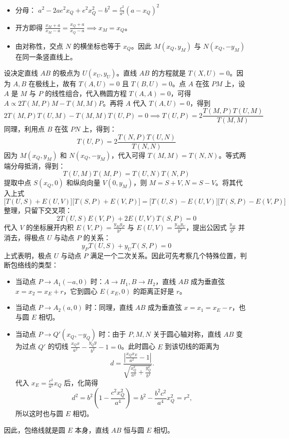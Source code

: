 \begin{solution}
\begin{itemize}
\item 分母： $a^2 - 2a e^2 x_Q + e^2 x_Q^2 - b^2 = \frac{c^2}{a^2}(a-x_Q)^2$
\item 开方即得 $\frac{x_M+a}{x_M-a} = \frac{x_Q+a}{x_Q-a}\implies x_M = x_Q$。
\item 由对称性，交点 $N$ 的横坐标也等于 $x_Q$。因此 $M(x_Q, y_M)$ 与 $N(x_Q, -y_M)$ 在同一条竖直线上。
\end{itemize}
设决定直线 $AB$ 的极点为 $U(x_U, y_U)$。直线 $AB$ 的方程就是 $T(X,U) = 0$。因为 $A, B$ 在极线上，故有 $T(A, U) = 0$ 且 $T(B, U) = 0$。点 $A$ 在弦 $PM$ 上，设 $A$ 是 $M$ 与 $P$ 的线性组合，代入椭圆方程 $T(A,A)=0$，可得
$A \propto 2T(M,P)M - T(M,M)P$。再将 $A$ 代入 $T(A,U)=0$，得到
$$2T(M,P)T(U,M) - T(M,M)T(U,P) = 0 \implies T(U,P) = 2 \frac{T(M,P)T(U,M)}{T(M,M)}$$
同理，利用点 $B$ 在弦 $PN$ 上，得到：
$$T(U,P) = 2 \frac{T(N,P)T(U,N)}{T(N,N)}$$
因为 $M(x_Q, y_M)$ 和 $N(x_Q, -y_M)$，代入可得 $T(M,M) = T(N,N)$。等式两端分母抵消，得到：
$$T(U,M) T(M,P) = T(U,N) T(N,P)$$
提取中点 $S(x_Q, 0)$ 和纵向向量 $V(0, y_M)$，则 $M = S+V, N = S-V$。将其代入上式
$$\big[T(U,S) + E(U,V)\big]\big[T(S,P) + E(V,P)\big] = \big[T(U,S) - E(U,V)\big]\big[T(S,P) - E(V,P)\big]$$
整理，只留下交叉项：
$$2 T(U,S) E(V,P) + 2 E(U,V) T(S,P) = 0$$
代入 $V$ 的坐标展开内积 $E(V,P) = \frac{y_M y_P}{b^2}$ 与 $E(U,V) = \frac{y_M y_U}{b^2}$，提出公因式 $\frac{y_M}{b^2}$ 并消去，得极点 $U$ 与动点 $P$ 的关系：
$$y_P T(U,S) + y_U T(S,P) = 0$$
上式表明，极点 $U$ 与动点 $P$ 满足一个二次关系。因此可先考察几个特殊位置，判断包络线的类型：
\begin{itemize}
\item 当动点 $P \to A_1(-a,0)$ 时：$A \to H_1, B \to H_2$，直线 $AB$ 成为垂直弦 $x = x_2 = x_E + r$，它到圆心 $E(x_E, 0)$ 的距离正好是 $r$。
\item 当动点 $P \to A_2(a,0)$ 时：同理，直线 $AB$ 成为垂直弦 $x = x_1 = x_E - r$，也与圆 $E$ 相切。
\item 当动点 $P \to Q'(x_Q, -y_Q)$ 时：由于 $P,M,N$ 关于圆心轴对称，直线 $AB$ 变为过点 $Q'$ 的切线 $\frac{x_Q x}{a^2} - \frac{y_Q y}{b^2} - 1 = 0$。此时圆心 $E$ 到该切线的距离为
$$d = \frac{\left| \frac{x_Q x_E}{a^2} - 1 \right|}{\sqrt{\frac{x_Q^2}{a^4} + \frac{y_Q^2}{b^4}}}.$$
代入 $x_E = \frac{c^2}{a^2}x_Q$ 后，化简得
$$d^2 = b^2\left(1 - \frac{c^2 x_Q^2}{a^4}\right) = b^2 - \frac{b^2 c^2}{a^4}x_Q^2 = r^2,$$
所以这时也与圆 $E$ 相切。
\end{itemize}
因此，包络线就是圆 $E$ 本身，直线 $AB$ 恒与圆 $E$ 相切。
\end{solution}

